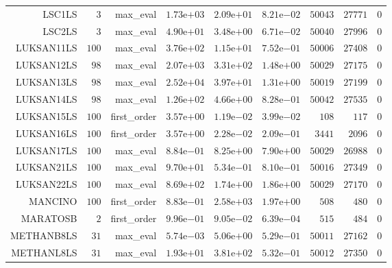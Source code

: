 \begin{longtable}{rrrrrrrrr}
LSC1LS & \(     3\) & max\_eval & \( 1.73\)e\(+03\) & \( 2.09\)e\(+01\) & \( 8.21\)e\(-02\) & \( 50043\) & \( 27771\) & \(     0\) \\
LSC2LS & \(     3\) & max\_eval & \( 4.90\)e\(+01\) & \( 3.48\)e\(+00\) & \( 6.71\)e\(-02\) & \( 50040\) & \( 27996\) & \(     0\) \\
LUKSAN11LS & \(   100\) & max\_eval & \( 3.76\)e\(+02\) & \( 1.15\)e\(+01\) & \( 7.52\)e\(-01\) & \( 50006\) & \( 27408\) & \(     0\) \\
LUKSAN12LS & \(    98\) & max\_eval & \( 2.07\)e\(+03\) & \( 3.31\)e\(+02\) & \( 1.48\)e\(+00\) & \( 50029\) & \( 27175\) & \(     0\) \\
LUKSAN13LS & \(    98\) & max\_eval & \( 2.52\)e\(+04\) & \( 3.97\)e\(+01\) & \( 1.31\)e\(+00\) & \( 50019\) & \( 27199\) & \(     0\) \\
LUKSAN14LS & \(    98\) & max\_eval & \( 1.26\)e\(+02\) & \( 4.66\)e\(+00\) & \( 8.28\)e\(-01\) & \( 50042\) & \( 27535\) & \(     0\) \\
LUKSAN15LS & \(   100\) & first\_order & \( 3.57\)e\(+00\) & \( 1.19\)e\(-02\) & \( 3.99\)e\(-02\) & \(   108\) & \(   117\) & \(     0\) \\
LUKSAN16LS & \(   100\) & first\_order & \( 3.57\)e\(+00\) & \( 2.28\)e\(-02\) & \( 2.09\)e\(-01\) & \(  3441\) & \(  2096\) & \(     0\) \\
LUKSAN17LS & \(   100\) & max\_eval & \( 8.84\)e\(-01\) & \( 8.25\)e\(+00\) & \( 7.90\)e\(+00\) & \( 50029\) & \( 26988\) & \(     0\) \\
LUKSAN21LS & \(   100\) & max\_eval & \( 9.70\)e\(+01\) & \( 5.34\)e\(-01\) & \( 8.10\)e\(-01\) & \( 50016\) & \( 27349\) & \(     0\) \\
LUKSAN22LS & \(   100\) & max\_eval & \( 8.69\)e\(+02\) & \( 1.74\)e\(+00\) & \( 1.86\)e\(+00\) & \( 50029\) & \( 27170\) & \(     0\) \\
MANCINO & \(   100\) & first\_order & \( 8.83\)e\(-01\) & \( 2.58\)e\(+03\) & \( 1.97\)e\(+00\) & \(   508\) & \(   480\) & \(     0\) \\
MARATOSB & \(     2\) & first\_order & \( 9.96\)e\(-01\) & \( 9.05\)e\(-02\) & \( 6.39\)e\(-04\) & \(   515\) & \(   484\) & \(     0\) \\
METHANB8LS & \(    31\) & max\_eval & \( 5.74\)e\(-03\) & \( 5.06\)e\(+00\) & \( 5.29\)e\(-01\) & \( 50011\) & \( 27162\) & \(     0\) \\
METHANL8LS & \(    31\) & max\_eval & \( 1.93\)e\(+01\) & \( 3.81\)e\(+02\) & \( 5.32\)e\(-01\) & \( 50012\) & \( 27350\) & \(     0\) \\

\end{longtable}
